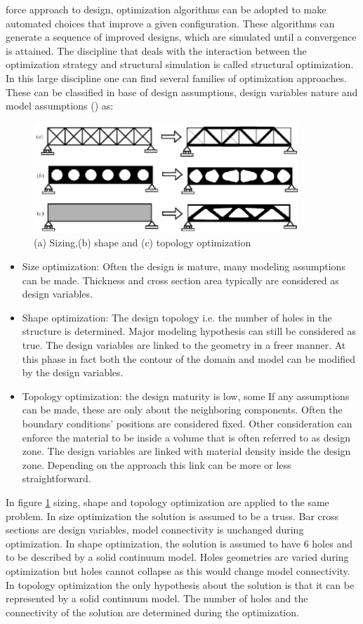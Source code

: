 force approach to design, optimization algorithms can be adopted to make automated choices that improve a given configuration. These algorithms can generate a sequence of improved designs, which are simulated until a convergence is attained. The discipline that deals with the interaction between the optimization strategy and structural simulation is called structural optimization. In this large discipline one can find several families of optimization approaches. These can be classified in base of design assumptions, design variables nature and model assumptions (\cite{bendsoe2003theory}) as:
\begin{figure}[ht]
\centering
\includegraphics[width=10cm]{images/Ch2/a-Sizing-b-shape-and-c-topological-optimization-3}
\caption{(a) Sizing,(b) shape and (c) topology optimization \cite{bendsoe2003theory} }
\label{fig.2.1a}
\end{figure}
\begin{itemize}
	\item Size optimization: Often the design is mature, many modeling assumptions can be made. Thickness and cross section area typically are considered as design variables.
	\item Shape optimization: The design topology i.e. the number of holes in the structure is determined. Major modeling hypothesis can still be considered as true. The design variables are linked to the geometry in a freer manner. At this phase in fact both the contour of the domain and model can be modified by the design variables. 
	\item Topology optimization: the design maturity is low, some If any assumptions can be made, these are only about the neighboring components. Often the boundary conditions' positions are considered fixed. Other consideration can enforce the material to be inside a volume that is often referred to as design zone.
	The design variables are linked with material density inside the design zone. Depending on the approach this link can be more or less straightforward.
\end{itemize}
In figure  \ref{fig.2.1a} sizing, shape and topology optimization are applied to the same problem. In size optimization the solution is assumed to be a truss. Bar cross sections are design variables, model connectivity is unchanged during optimization. In shape optimization, the solution is assumed to have 6 holes and to be described by a solid continuum model. Holes geometries are varied during optimization but holes cannot collapse as this would change model connectivity. In topology optimization the only hypothesis about the solution  is that it can be represented by a solid continuum model. The number of holes and the connectivity of the solution are determined during the optimization.  
